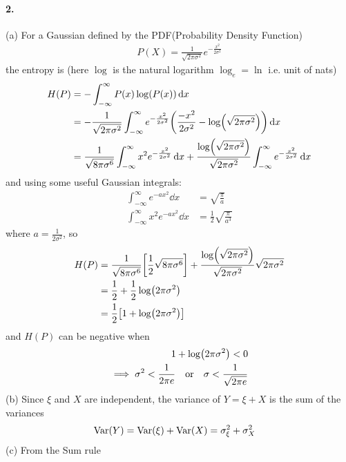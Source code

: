 \documentclass[../main.tex]{subfiles}
\begin{document}
\paragraph*{2.} (a) For a Gaussian defined by the PDF(Probability Density Function)
\begin{align*}
    P(X) = \frac{1}{\sqrt{2\pi\sigma^2}} e^{-\frac{x^2}{2\sigma^2}}
\end{align*}
the entropy is (here $\log$ is the natural logarithm $\log_e = \ln$ i.e. unit of nats)
\begin{align*}
    H(P) &= -\int_{-\infty}^\infty P(x) \log(P(x)) \dd{x} \\
    &= -\frac{1}{\sqrt{2\pi\sigma^2}} \int_{-\infty}^\infty e^{-\frac{x^2}{2\sigma^2}} 
        \qt(\frac{-x^2}{2\sigma^2} - \log(\sqrt{2\pi\sigma^2})) \dd{x} \\
    &= \frac{1}{\sqrt{8\pi\sigma^6}} \int_{-\infty}^\infty x^2 e^{-\frac{x^2}{2\sigma^2}} \dd{x} 
        + \frac{\log(\sqrt{2\pi\sigma^2})}{\sqrt{2\pi\sigma^2}} \int_{-\infty}^\infty e^{-\frac{x^2}{2\sigma^2}} \dd{x} \\
\end{align*}
and using some useful Gaussian integrals:
\begin{align*}
    \int_{-\infty}^\infty e^{-ax^2} \dd{x} &= \sqrt{\frac{\pi}{a}} \\
    \int_{-\infty}^\infty x^2 e^{-ax^2} \dd{x} &= \frac{1}{2} \sqrt{\frac{\pi}{a^3}}
\end{align*}
where $a = \frac{1}{2\sigma^2}$, so
\begin{align*}
    H(P) &= \frac{1}{\sqrt{8\pi\sigma^6}} \qt[\frac{1}{2} \sqrt{8\pi\sigma^6}] 
        + \frac{\log(\sqrt{2\pi\sigma^2})}{\sqrt{2\pi\sigma^2}} \sqrt{2\pi\sigma^2} \\
    &= \frac{1}{2} + \frac{1}{2} \log(2\pi\sigma^2) \\
    &= \frac{1}{2} \qt[1 + \log(2\pi\sigma^2)]
\end{align*}
and $H(P)$ can be negative when
\begin{align*}
    1 + \log(2\pi\sigma^2) < 0 \\
    \implies \sigma^2 < \frac{1}{2\pi e} \qor \sigma < \frac{1}{\sqrt{2\pi e}}
\end{align*}
(b) Since $\xi$ and $X$ are independent, the variance of $Y = \xi + X$ is the sum of the variances
\begin{align*}
    \operatorname{Var}(Y) &= \operatorname{Var}(\xi) + \operatorname{Var}(X) = \sigma_\xi^2 + \sigma_X^2
\end{align*}
(c) From the Sum rule
\end{document}
